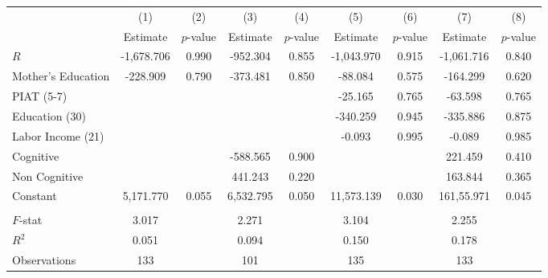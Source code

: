 \begin{tabular}{lcccccccc} \toprule
 & (1) & (2) & (3) & (4) & (5) & (6) & (7) & (8) \\ 
 & Estimate  & $p$-value  & Estimate  & $p$-value  & Estimate  & $p$-value  & Estimate  & $p$-value  \\  \midrule
$R$ & -1,678.706 &     0.990 &  -952.304 &     0.855 & -1,043.970 &     0.915 & -1,061.716 &     0.840 \\  
Mother's Education &  -228.909 &     0.790 &  -373.481 &     0.850 &   -88.084 &     0.575 &  -164.299 &     0.620 \\  
PIAT (5-7) &         &         &         &         &   -25.165 &     0.765 &   -63.598 &     0.765 \\  
Education (30) &         &         &         &         &  -340.259 &     0.945 &  -335.886 &     0.875 \\  
Labor Income (21) &         &         &         &         &    -0.093 &     0.995 &    -0.089 &     0.985 \\  
Cognitive &         &         &  -588.565 &     0.900 &         &         &   221.459 &     0.410 \\  
Non Cognitive &         &         &   441.243 &     0.220 &         &         &   163.844 &     0.365 \\  
Constant &  5,171.770 &     0.055 &  6,532.795 &     0.050 & 11,573.139 &     0.030 & 161,55.971 &     0.045 \\  \\ \midrule
$F$-stat &     3.017 &         &     2.271 &         &     3.104 &         &     2.255 &         \\  
$R^2$ &     0.051 &         &     0.094 &         &     0.150 &         &     0.178 &         \\  
Observations &   133 &         &   101 &         &   135 &         &   133 &         \\  
\bottomrule \end{tabular}